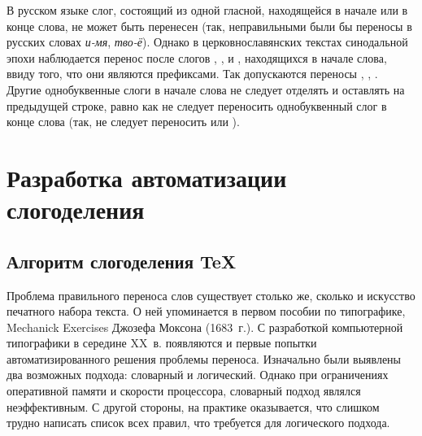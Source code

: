 \documentclass[12pt,a4paper,oneside]{extarticle}
\begin{document}
В русском языке слог, состоящий из одной гласной, находящейся в начале или в конце слова, не может быть перенесен (так, неправильными были бы переносы в русских словах \emph{и-мя}, \emph{тво-ё}). Однако в церковнославянских текстах синодальной эпохи наблюдается перенос после слогов , , и , находящихся в начале слова, ввиду того, что они являются префиксами. Так допускаются переносы , , .  Другие однобуквенные слоги в начале слова не следует отделять и оставлять на предыдущей строке, равно как не следует переносить однобуквенный слог в конце слова (так, не следует переносить  или ).

\section{Разработка автоматизации слогоделения}

\subsection{Алгоритм слогоделения \TeX{}}

Проблема правильного переноса слов существует столько же, сколько и искусство печатного набора текста. О ней упоминается в первом пособии по типографике, \textenglish{Mechanick Exercises} Джозефа Моксона (1683~г.). С разработкой компьютерной типографики в середине XX~в. появляются и первые попытки автоматизированного решения проблемы переноса. Изначально были выявлены два возможных подхода: словарный и логический. Однако при ограничениях оперативной памяти и скорости процессора, словарный подход являлся неэффективным. С другой стороны, на практике оказывается, что слишком трудно написать список всех правил, что требуется для логического подхода.
\end{document}
